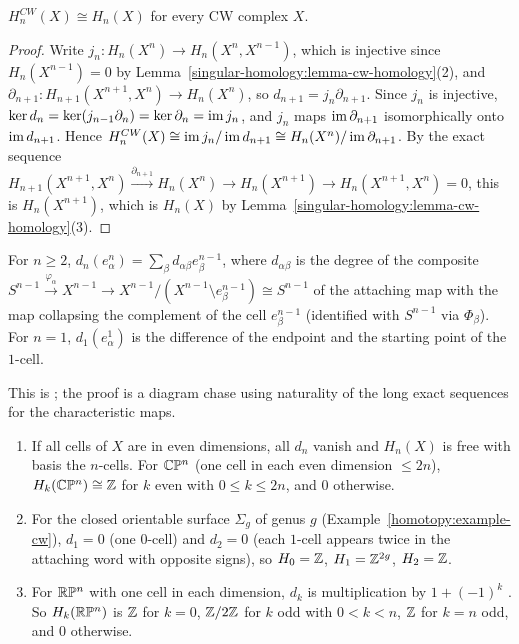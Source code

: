 \begin{theorem}\label{singular-homology:theorem-cellular}
$H^{CW}_n(X) \cong H_n(X)$ for every CW complex $X$.
\end{theorem}

\begin{proof}
Write $j_n \colon H_n(X^n) \to H_n(X^n, X^{n-1})$, which is injective since $H_n(X^{n-1}) = 0$ by Lemma~\ref{singular-homology:lemma-cw-homology}(2), and
$\partial_{n+1} \colon H_{n+1}(X^{n+1}, X^n) \to H_n(X^n)$, so $d_{n+1} = j_n\partial_{n+1}$. Since $j_n$ is injective, $\ker d_n = \ker(j_{n-1}\partial_n) = \ker\partial_n = \operatorname{im} j_n$, and
$j_n$ maps $\operatorname{im}\partial_{n+1}$ isomorphically onto $\operatorname{im} d_{n+1}$. Hence
$H^{CW}_n(X) \cong \operatorname{im} j_n/\operatorname{im} d_{n+1} \cong H_n(X^n)/\operatorname{im}\partial_{n+1}$. By the exact sequence $H_{n+1}(X^{n+1}, X^n) \xrightarrow{\partial_{n+1}} H_n(X^n) \to H_n(X^{n+1}) \to H_n(X^{n+1}, X^n) = 0$,
this is $H_n(X^{n+1})$, which is $H_n(X)$ by Lemma~\ref{singular-homology:lemma-cw-homology}(3).
\end{proof}

\begin{theorem}\label{singular-homology:theorem-cellular-boundary}
For $n \geq 2$, $d_n(e^n_\alpha) = \sum_\beta d_{\alpha\beta}e^{n-1}_\beta$, where $d_{\alpha\beta}$ is the degree of the composite
$S^{n-1} \xrightarrow{\varphi_\alpha} X^{n-1} \to X^{n-1}/(X^{n-1} \setminus e^{n-1}_\beta) \cong S^{n-1}$ of the attaching map with the map collapsing the complement of
the cell $e^{n-1}_\beta$ (identified with $S^{n-1}$ via $\Phi_\beta$). For $n = 1$, $d_1(e^1_\alpha)$ is the difference of the endpoint and the starting point of the
$1$-cell.
\end{theorem}

This is \cite[Section 2.2, Cellular Boundary Formula]{hatcher-at}; the proof is a diagram chase using naturality of the long exact sequences for the characteristic
maps.

\begin{example}\label{singular-homology:example-cellular-computations}
\begin{enumerate}
\item If all cells of $X$ are in even dimensions, all $d_n$ vanish and $H_n(X)$ is free with basis the $n$-cells. For $\mathbb{C}\mathbb{P}^n$ (one cell in each even dimension
$\leq 2n$), $H_k(\mathbb{C}\mathbb{P}^n) \cong \mathbb{Z}$ for $k$ even with $0 \leq k \leq 2n$, and $0$ otherwise.
\item For the closed orientable surface $\Sigma_g$ of genus $g$ (Example~\ref{homotopy:example-cw}), $d_1 = 0$ (one $0$-cell) and $d_2 = 0$ (each $1$-cell appears twice
in the attaching word with opposite signs), so $H_0 = \mathbb{Z}$, $H_1 = \mathbb{Z}^{2g}$, $H_2 = \mathbb{Z}$.
\item For $\mathbb{R}\mathbb{P}^n$ with one cell in each dimension, $d_k$ is multiplication by $1 + (-1)^k$ \cite[Example 2.42]{hatcher-at}. So $H_k(\mathbb{R}\mathbb{P}^n)$ is $\mathbb{Z}$ for $k = 0$,
$\mathbb{Z}/2\mathbb{Z}$ for $k$ odd with $0 < k < n$, $\mathbb{Z}$ for $k = n$ odd, and $0$ otherwise.
\end{enumerate}
\end{example}

